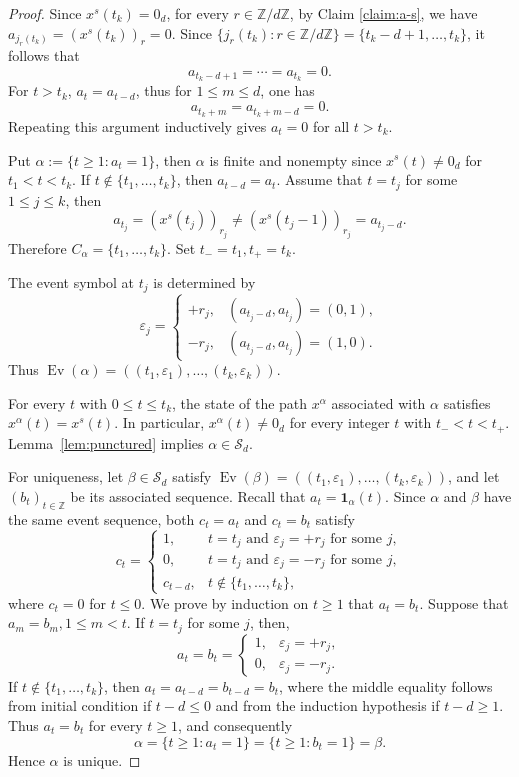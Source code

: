 \documentclass[11pt]{amsart}
\theoremstyle{definition}
\theoremstyle{remark}
\newcommand{\Sd}{\mathcal S_d}
\begin{document}
\begin{proof}
Since $x^s(t_k)=0_d$, for every $r\in\mathbb Z/d\mathbb Z$,
by Claim \ref{claim:a-s}, we have $a_{j_r(t_k)}=(x^s(t_k))_r=0$.
Since $\{j_r(t_k):r\in\mathbb Z/d\mathbb Z\}=\{t_k-d+1,\ldots,t_k\}$,
it follows that
\[
a_{t_k-d+1}=\cdots=a_{t_k}=0.
\]
For $t>t_k$, $a_t=a_{t-d}$, thus for $1\leq m\leq d$, one has
\[
a_{t_k+m} =a_{t_k+m-d}=0.
\]
Repeating this argument inductively gives $a_t=0$ for all $t>t_k$.
 
Put $\alpha:=\{t\geq1:a_t =1\}$, then $\alpha $ is finite and nonempty since $x^s(t) \neq 0_d$ for $t_1<t <t_k$.
If $t\notin\{t_1,\ldots,t_k\}$, then $a_{t-d}=a_t$.
Assume that $t=t_j$ for some $1\le j \le k$, then 
\[
 a_{t_j}= (x^s(t_j))_{r_j} \neq  (x^s(t_j-1))_{r_j} =a_{t_j-d}.
\]
Therefore $C_\alpha=\{t_1,\ldots,t_k\}$. Set $t_-=t_1, t_+=t_k$.
 
The event symbol at $t_j$ is determined by
\[
 \varepsilon_j=
 \begin{cases}
 +r_j,&(a_{t_j-d},a_{t_j})=(0,1),\\
 -r_j,&(a_{t_j-d},a_{t_j})=(1,0).
 \end{cases}
\]
Thus $\operatorname{Ev}(\alpha)
 =((t_1,\varepsilon_1),\ldots,(t_k,\varepsilon_k))$.
 

For every $t$ with $0\leq t\leq t_k$, the state of the path $x^{\alpha}$ associated with $\alpha$  satisfies $x^\alpha(t)=x^s(t)$.
In particular, $x^\alpha(t)\neq0_d$ for every
integer $t$ with $t_-<t<t_+$.
Lemma~\ref{lem:punctured} implies $\alpha\in\Sd$.
 

For uniqueness, let $\beta\in\Sd$ satisfy $\operatorname{Ev}(\beta)=((t_1,\varepsilon_1),\ldots,(t_k,\varepsilon_k))$,
and let $(b_t)_{t\in \mathbb{Z}}$ be its  associated sequence.
Recall that $a_t=\mathbf 1_\alpha(t)$.
Since $\alpha$ and $\beta$ have the same event sequence, both
$c_t=a_t$ and $c_t=b_t$ satisfy
\[
c_t=\begin{cases}
1,&t=t_j\text{ and }\varepsilon_j=+r_j
   \text{ for some }j,\\
0,&t=t_j\text{ and }\varepsilon_j=-r_j
   \text{ for some }j,\\
c_{t-d},&t\notin\{t_1,\ldots,t_k\},
\end{cases}
\]
where $c_t=0$ for $t\leq0$.
We prove by induction on $t\geq1$ that $a_t=b_t$.
Suppose that $a_m=b_m, 1\leq m<t$.
If $t=t_j$ for some $j$, then,
\[
a_t=b_t=\begin{cases}
1,&\varepsilon_j=+r_j,\\
0,&\varepsilon_j=-r_j.
\end{cases}
\]
If $t\notin\{t_1,\ldots,t_k\}$, then $a_t=a_{t-d}=b_{t-d}=b_t$,
where the middle equality follows from initial condition if $t-d\le 0$ and from the induction hypothesis if $t-d\ge 1$.
Thus $a_t=b_t$ for every $t\geq1$, and consequently  
\[
\alpha=\{t\geq1:a_t=1\}=\{t\geq1:b_t=1\}=\beta.
\]
Hence $\alpha$ is unique.


\end{proof}
\end{document}
